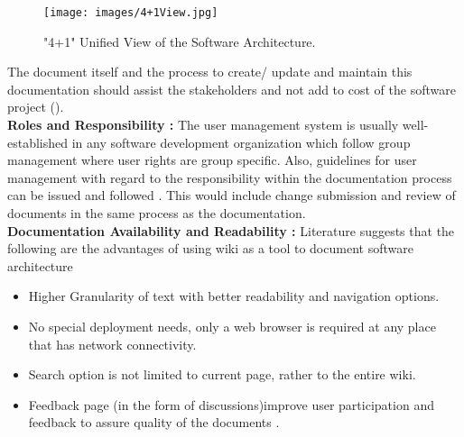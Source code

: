 \begin{figure}[H]
  \centering
  \texttt{[image: images/4+1View.jpg]}
  \caption["4+1" Unified View of the Software Architecture \cite{bab2009}]{"4+1" Unified View of the Software Architecture.}\label{fig:4_1_view}
\end{figure}
\indent The document itself and the process to create/ update and maintain this documentation should assist the stakeholders and not add to cost of the software project (\cite{Shahin2014}).
\\\indent \textbf{Roles and Responsibility : }The user management system is usually well-established in any software development organization which follow group management where user rights are group specific. Also, guidelines for user management with regard to the responsibility within the documentation process can be issued and followed \cite{5314237}. This would include change submission and review of documents in the same process as the documentation.
\\\indent \textbf{Documentation Availability and Readability : } Literature suggests that the following are the advantages of using wiki as a tool to document software architecture \cite{Bachmann2005}
\begin{itemize}
\item Higher Granularity of text with better readability and navigation options.
\item No special deployment needs, only a web browser is required at any place that has network connectivity.
\item Search option is not limited to current page, rather to the entire wiki.
\item Feedback page (in the form of discussions)improve user participation and feedback to assure quality of the documents \cite{Zhao2003}.
\end{itemize}


